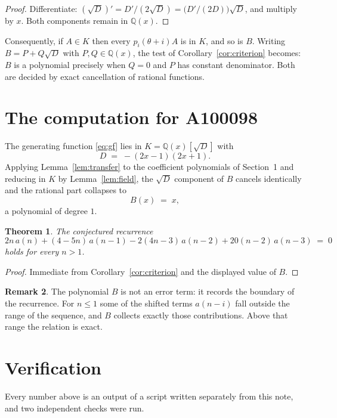 \documentclass[11pt,a4paper]{article}
\theoremstyle{plain}
\newtheorem{theorem}{Theorem}
\theoremstyle{definition}
\newtheorem{remark}[theorem]{Remark}
\begin{document}
\begin{proof}
Differentiate: $(\sqrt{D})'=D'/(2\sqrt{D})=\bigl(D'/(2D)\bigr)\sqrt{D}$, and multiply by
$x$. Both components remain in $\mathbb{Q}(x)$.
\end{proof}

Consequently, if $A\in K$ then every $p_{i}(\theta+i)A$ is in $K$, and so is $B$. Writing
$B=P+Q\sqrt{D}$ with $P,Q\in\mathbb{Q}(x)$, the test of Corollary~\ref{cor:criterion}
becomes: $B$ is a polynomial precisely when $Q=0$ and $P$ has constant denominator. Both
are decided by exact cancellation of rational functions.

\section{The computation for A100098}

The generating function \eqref{eq:gf} lies in $K=\mathbb{Q}(x)[\sqrt{D}]$ with
\[
D \;=\; - \left(2 x - 1\right) \left(2 x + 1\right) .
\]
Applying Lemma~\ref{lem:transfer} to the coefficient polynomials of Section~1 and reducing
in $K$ by Lemma~\ref{lem:field}, the $\sqrt{D}$ component of $B$ cancels identically and
the rational part collapses to
\[
B(x)\;=\;x ,
\]
a polynomial of degree $1$.

\begin{theorem}
The conjectured recurrence
\[
2 n\,a(n) + (4 - 5 n)\,a(n-1) -  2 \left(4 n - 3\right)\,a(n-2) + 20 \left(n - 2\right)\,a(n-3) \;=\;0
\]
holds for every $n>1$.
\end{theorem}

\begin{proof}
Immediate from Corollary~\ref{cor:criterion} and the displayed value of $B$.
\end{proof}

\begin{remark}
The polynomial $B$ is not an error term: it records the boundary of the recurrence. For
$n\le1$ some of the shifted terms $a(n-i)$ fall outside the range of the sequence,
and $B$ collects exactly those contributions. Above that range the relation is exact.
\end{remark}

\section{Verification}

Every number above is an output of a script written separately from this note, and two
independent checks were run.
\end{document}
